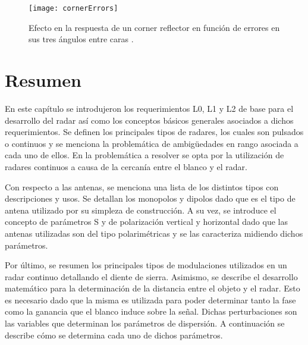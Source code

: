 \begin{figure}[H]
 \centering
 \texttt{[image: cornerErrors]}
 \caption{Efecto en la respuesta de un corner reflector en función de errores en sus tres ángulos entre caras \cite{Michelson1993}.}
 \label{fig:cornerErrors}
\end{figure}


\section{Resumen}

En este capítulo se introdujeron los requerimientos L0, L1 y L2 de base para el desarrollo del radar así como los conceptos básicos generales asociados a dichos requerimientos. Se definen los principales tipos de radares, los cuales son pulsados o continuos y se menciona la problemática de ambigüedades en rango asociada a cada uno de ellos. En la problemática a resolver se opta por la utilización de radares continuos a causa de la cercanía entre el blanco y el radar.

Con respecto a las antenas, se menciona una lista de los distintos tipos con descripciones y usos. Se detallan los monopolos y dipolos dado que es el tipo de antena utilizado por su simpleza de construcción. A su vez, se introduce el concepto de parámetros S y de polarización vertical y horizontal dado que las antenas utilizadas son del tipo polarimétricas y se las caracteriza midiendo dichos parámetros.

Por último, se resumen los principales tipos de modulaciones utilizados en un radar continuo detallando el diente de sierra. Asimismo, se describe el desarrollo matemático para la determinación de la distancia entre el objeto y el radar. Esto es necesario dado que la misma es utilizada para poder determinar tanto la fase como la ganancia que el blanco induce sobre la señal. Dichas perturbaciones son las variables que determinan los parámetros de dispersión. A continuación se describe cómo se determina cada uno de dichos parámetros.

